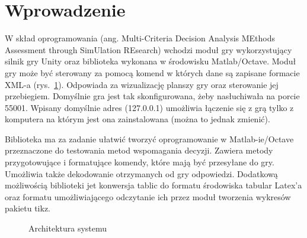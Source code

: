 
\section{Wprowadzenie}

W skład oprogramowania  \SoftwareName (ang. Multi-Criteria Decision Analysis MEthods Assessment through SimUlation REsearch) wchodzi moduł gry wykorzystujący silnik gry Unity oraz biblioteka wykonana w środowisku Matlab/Octave. Moduł gry może być sterowany za pomocą komend w których dane są zapisane formacie XML-a (rys.~\ref{Fig:architecture}). Odpowiada za wizualizację planszy gry oraz sterowanie jej przebiegiem. Domyślnie gra jest tak skonfigurowana, żeby nasłuchiwała na porcie 55001. Wpisany domyślnie adres (127.0.0.1) umożliwia łączenie się z grą tylko z komputera na którym jest ona zainstalowana (można to jednak zmienić).

 Biblioteka ma za zadanie ułatwić tworzyć oprogramowanie w Matlab-ie/Octave przeznaczone do testowania metod wspomagania decyzji.  Zawiera metody przygotowujące i formatujące komendy, które mają być przesyłane do gry. Umożliwia także dekodowanie otrzymanych od gry odpowiedzi. Dodatkową możliwością biblioteki jet konwersja tablic do formatu środowiska tabular Latex'a oraz formatu umożliwiającego odczytanie ich przez  moduł tworzenia wykresów pakietu tikz.

\begin{figure}

\caption{Architektura systemu}
\label{Fig:architecture}
\end{figure}